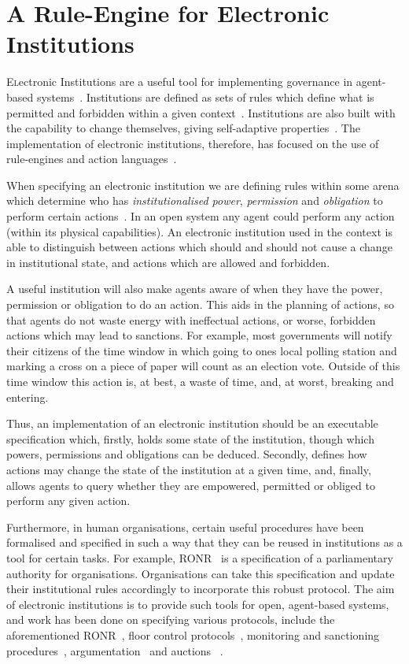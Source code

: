 \chapter{A Rule-Engine for Electronic Institutions}\label{ch:droolseinst}

\lettrine[lines=3]{E}lectronic Institutions are a useful tool for implementing
governance in agent-based systems~\citep{Esteva2001}. Institutions are defined
as sets of rules which define what is permitted and forbidden within a given
context~\citep{Ostrom1990}. Institutions are also built with the capability to
change themselves, giving self-adaptive properties~\citep{North1990}. The
implementation of electronic institutions, therefore, has focused on the use of
rule-engines and action languages~\citep{Artikis2012a,Arcos2005,Garcia-Camino2009}.

When specifying an electronic institution we are defining rules within some
arena which determine who has \emph{institutionalised power}, \emph{permission}
and \emph{obligation} to perform certain actions~\citep{Jones1996}. In an open
system any agent could perform any action (within its physical capabilities). An
electronic institution used in the context is able to distinguish between
actions which should and should not cause a change in institutional state, and
actions which are allowed and forbidden.

A useful institution will also make agents aware of when they have the power,
permission or obligation to do an action. This aids in the planning of actions,
so that agents do not waste energy with ineffectual actions, or worse, forbidden
actions which may lead to sanctions. For example, most governments will notify
their citizens of the time window in which going to ones local polling station
and marking a cross on a piece of paper will count as an election vote. Outside
of this time window this action is, at best, a waste of time, and, at worst,
breaking and entering.

Thus, an implementation of an electronic institution should be an executable
specification which, firstly, holds some state of the institution, though which
powers, permissions and obligations can be deduced. Secondly, defines how
actions may change the state of the institution at a given time, and, finally,
allows agents to query whether they are empowered, permitted or obliged to perform
any given action.

Furthermore, in human organisations, certain useful procedures have been
formalised and specified in such a way that they can be reused in institutions
as a tool for certain tasks. For example, \ac{RONR}~\citep{Robert2011} is a
specification of a parliamentary authority for organisations. Organisations
can take this specification and update their institutional rules accordingly
to incorporate this robust protocol. The aim of electronic institutions is to
provide such tools for open, agent-based systems, and work has been done on
specifying various protocols, include the aforementioned
\ac{RONR}~\citep{Pitt2005a}, floor control
protocols~\citep{Artikis2004,Artikis2009b}, monitoring and sanctioning
procedures~\citep{Pitt2012c}, argumentation~\citep{Artikis2003} and auctions~
\citep{Rodriguez1997}.

